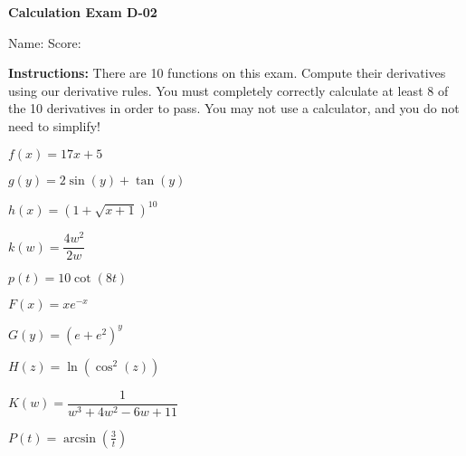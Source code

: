 \documentclass[10pt,answers,addpoints]{exam}
\begin{document}



{\bfseries\large Calculation Exam D-02}
{}%

Name: \makebox[4.18in]{\hrulefill} \quad Score: \makebox[0.75in]{\hrulefill} %


\vspace{0.2in}

\textbf{Instructions: } There are 10 functions on this exam. Compute their derivatives using our derivative rules. You must completely correctly calculate at least 8 of the 10 derivatives in order to pass. You may not use a calculator, and you do not need to simplify! 




\begin{questions}

\question $f(x)= 17x + 5$

\vfill

\question $g(y) = 2\sin(y) + \tan(y)$

\vfill

\question $h(x) = (1+\sqrt{x+1})^{10}$

\vfill


\question $k(w) = \dfrac{4w^2}{2w}$

\vfill

\question $p(t) = 10\cot(8t) $

\vfill

\newpage


\question $F(x) = x e^{-x}$

\vfill


\question $G(y) = (e+e^2)^y$

\vfill

\question $H(z) = \ln(\cos^2(z))$

\vfill

\question $K(w) = \dfrac{1}{w^3+4w^2-6w+11}$

\vfill

\question $P(t) = \arcsin\left(\frac{3}{t}\right)$

\vfill

\thispagestyle{empty}

\end{questions}
\end{document}
